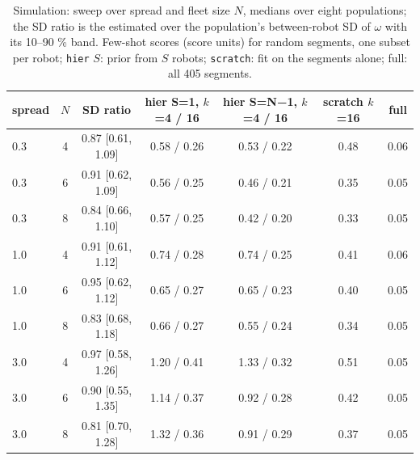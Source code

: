 \begin{table}[t]
\caption{Simulation: sweep over spread and fleet size \(N\), medians over eight populations; the SD ratio is the estimated over the population's between-robot SD of \(\omega\) with its 10--90 \% band. Few-shot scores (score units) for random segments, one subset per robot; \texttt{hier} \(S\): prior from \(S\) robots; \texttt{scratch}: fit on the segments alone; full: all 405 segments.}
\label{tab:3}
\centering\footnotesize
\begin{tabular}{lcccccc}
\toprule
spread & \(N\) & SD ratio & hier S=1, \(k\)=4 / 16 & hier S=N−1, \(k\)=4 / 16 & scratch \(k\)=16 & full \\
\midrule
0.3 & 4 & 0.87 {[}0.61, 1.09{]} & 0.58 / 0.26 & 0.53 / 0.22 & 0.48 & 0.06 \\
0.3 & 6 & 0.91 {[}0.62, 1.09{]} & 0.56 / 0.25 & 0.46 / 0.21 & 0.35 & 0.05 \\
0.3 & 8 & 0.84 {[}0.66, 1.10{]} & 0.57 / 0.25 & 0.42 / 0.20 & 0.33 & 0.05 \\
1.0 & 4 & 0.91 {[}0.61, 1.12{]} & 0.74 / 0.28 & 0.74 / 0.25 & 0.41 & 0.06 \\
1.0 & 6 & 0.95 {[}0.62, 1.12{]} & 0.65 / 0.27 & 0.65 / 0.23 & 0.40 & 0.05 \\
1.0 & 8 & 0.83 {[}0.68, 1.18{]} & 0.66 / 0.27 & 0.55 / 0.24 & 0.34 & 0.05 \\
3.0 & 4 & 0.97 {[}0.58, 1.26{]} & 1.20 / 0.41 & 1.33 / 0.32 & 0.51 & 0.05 \\
3.0 & 6 & 0.90 {[}0.55, 1.35{]} & 1.14 / 0.37 & 0.92 / 0.28 & 0.42 & 0.05 \\
3.0 & 8 & 0.81 {[}0.70, 1.28{]} & 1.32 / 0.36 & 0.91 / 0.29 & 0.37 & 0.05 \\
\bottomrule
\end{tabular}
\end{table}
